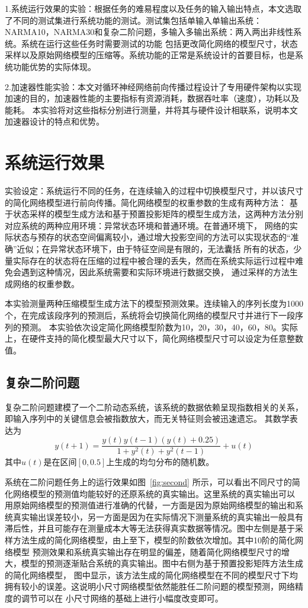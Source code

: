 1.系统运行效果的实验：根据任务的难易程度以及任务的输入输出特点，本文选取了不同的测试集进行系统功能的测试。测试集包括单输入单输出系统：
NARMA10，NARMA30和复杂二阶问题，多输入多输出系统：两入两出非线性系统。系统在运行这些任务时需要测试的功能
包括更改简化网络的模型尺寸，状态采样以及原始网络模型的压缩等。系统功能的正常是系统设计的首要目标，也是系统功能优势的实际体现。

2.加速器性能实验：本文对循环神经网络前向传播过程设计了专用硬件架构以实现加速的目的，加速器性能的主要指标有资源消耗，数据吞吐率（速度），功耗以及能耗。
本实验将对这些指标分别进行测量，并将其与硬件设计相联系，说明本文加速器设计的特点和优势。

\section{系统运行效果}
实验设定：系统运行不同的任务，在连续输入的过程中切换模型尺寸，并以该尺寸的简化网络模型进行前向传播。简化网络模型的权重参数的生成有两种方法：
基于状态采样的模型生成方法和基于预置投影矩阵的模型生成方法，这两种方法分别对应系统的两种应用环境：异常状态环境和普通环境。在普通环境下，
网络的实际状态与预存的状态空间偏离较小，通过增大投影空间的方法可以实现状态的“准确”近似；在异常状态环境下，由于特征空间是有限的，无法囊括
所有的状态，少量实际存在的状态将在压缩的过程中被合理的丢失，然而在系统实际运行过程中难免会遇到这种情况，因此系统需要和实际环境进行数据交换，
通过采样的方法生成网络的权重参数。

本实验测量两种压缩模型生成方法下的模型预测效果。连续输入的序列长度为1000个，在完成该段序列的预测后，系统将会切换简化网络的模型尺寸并进行下一段序列的预测。
本实验依次设定简化网络模型阶数为10，20，30，40，60，80。实际上，在硬件支持的简化模型最大尺寸以下，简化网络模型尺寸可以设定为任意整数值。

\subsection{复杂二阶问题}
复杂二阶问题建模了一个二阶动态系统，该系统的数据依赖呈现指数相关的关系，即输入序列中的关键信息会被指数放大，而无关特征则会被迅速遗忘。
其数学表达为
\begin{equation}
	y(t+1) = \frac{y(t)y(t-1)(y(t)+0.25)}{1+y^2(t)+y^2(t-1)} + u(t)
\end{equation}
其中\(u(t)\)是在区间\([0,0.5]\)上生成的均匀分布的随机数。


系统在二阶问题任务上的运行效果如图~\ref{fig:second} 所示，可以看出不同尺寸的简化网络模型的预测值均能较好的还原系统的真实输出。这里系统的真实输出可以
用原始网络模型的预测值进行准确的代替，一方面是因为原始网络模型的输出和系统真实输出误差较小，另一方面是因为在实际情况下测量系统的真实输出一般具有
滞后性，并且可能存在测量成本大等无法获得真实数据等情况。图中左侧是基于采样方法生成的简化网络模型，由上至下，模型的阶数依次增加。其中10阶的简化网络模型
预测效果和系统真实输出存在明显的偏差，随着简化网络模型尺寸的增大，模型的预测逐渐贴合系统的真实输出。图中右侧为基于预置投影矩阵方法生成的简化网络模型，
图中显示，该方法生成的简化网络模型在不同的模型尺寸下均拥有较小的误差。这说明小尺寸网络模型依然能胜任二阶问题的模型预测，网络精度的调节可以在
小尺寸网络的基础上进行小幅度改变即可。

